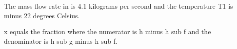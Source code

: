 The mass flow rate in is 4.1 kilograms per second and the temperature T1 is minus 22 degrees Celsius.

x equals the fraction where the numerator is h minus h sub f and the denominator is h sub g minus h sub f.